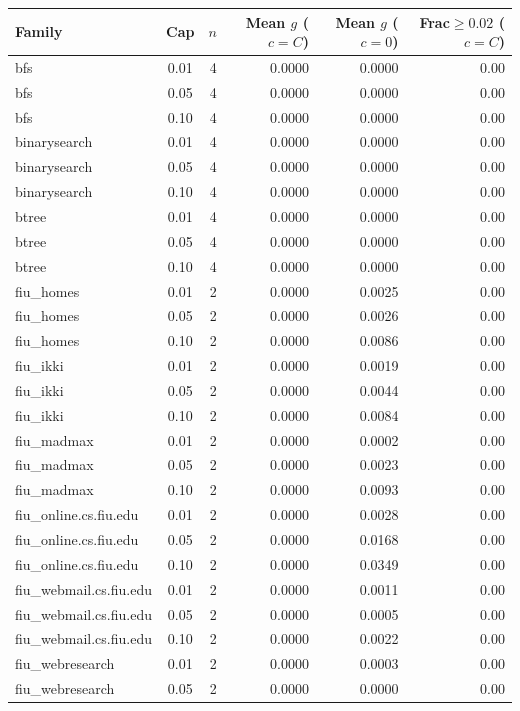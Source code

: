\begin{tabular}{lcrrrr}
\toprule
Family & Cap & $n$ & Mean $g$ ($c=C$) & Mean $g$ ($c=0$) & Frac$\ge 0.02$ ($c=C$) \\
\midrule
bfs & 0.01 & 4 & 0.0000 & 0.0000 & 0.00 \\
bfs & 0.05 & 4 & 0.0000 & 0.0000 & 0.00 \\
bfs & 0.10 & 4 & 0.0000 & 0.0000 & 0.00 \\
binarysearch & 0.01 & 4 & 0.0000 & 0.0000 & 0.00 \\
binarysearch & 0.05 & 4 & 0.0000 & 0.0000 & 0.00 \\
binarysearch & 0.10 & 4 & 0.0000 & 0.0000 & 0.00 \\
btree & 0.01 & 4 & 0.0000 & 0.0000 & 0.00 \\
btree & 0.05 & 4 & 0.0000 & 0.0000 & 0.00 \\
btree & 0.10 & 4 & 0.0000 & 0.0000 & 0.00 \\
fiu\_homes & 0.01 & 2 & 0.0000 & 0.0025 & 0.00 \\
fiu\_homes & 0.05 & 2 & 0.0000 & 0.0026 & 0.00 \\
fiu\_homes & 0.10 & 2 & 0.0000 & 0.0086 & 0.00 \\
fiu\_ikki & 0.01 & 2 & 0.0000 & 0.0019 & 0.00 \\
fiu\_ikki & 0.05 & 2 & 0.0000 & 0.0044 & 0.00 \\
fiu\_ikki & 0.10 & 2 & 0.0000 & 0.0084 & 0.00 \\
fiu\_madmax & 0.01 & 2 & 0.0000 & 0.0002 & 0.00 \\
fiu\_madmax & 0.05 & 2 & 0.0000 & 0.0023 & 0.00 \\
fiu\_madmax & 0.10 & 2 & 0.0000 & 0.0093 & 0.00 \\
fiu\_online.cs.fiu.edu & 0.01 & 2 & 0.0000 & 0.0028 & 0.00 \\
fiu\_online.cs.fiu.edu & 0.05 & 2 & 0.0000 & 0.0168 & 0.00 \\
fiu\_online.cs.fiu.edu & 0.10 & 2 & 0.0000 & 0.0349 & 0.00 \\
fiu\_webmail.cs.fiu.edu & 0.01 & 2 & 0.0000 & 0.0011 & 0.00 \\
fiu\_webmail.cs.fiu.edu & 0.05 & 2 & 0.0000 & 0.0005 & 0.00 \\
fiu\_webmail.cs.fiu.edu & 0.10 & 2 & 0.0000 & 0.0022 & 0.00 \\
fiu\_webresearch & 0.01 & 2 & 0.0000 & 0.0003 & 0.00 \\
fiu\_webresearch & 0.05 & 2 & 0.0000 & 0.0000 & 0.00 \\

\end{tabular}
